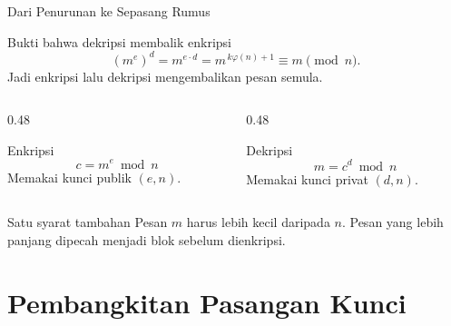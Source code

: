\documentclass[aspectratio=169,11pt]{beamer}
\begin{document}
\begin{frame}{Dari Penurunan ke Sepasang Rumus}
    \footnotesize
    \begin{block}{Bukti bahwa dekripsi membalik enkripsi}
        \[
            (m^{e})^{d} = m^{e \cdot d}
            = m^{\,k\varphi(n)+1} \equiv m \pmod{n}.
        \]
        Jadi enkripsi lalu dekripsi mengembalikan pesan semula.
    \end{block}
    \vspace{0.15cm}
    \begin{columns}[T,onlytextwidth]
        \begin{column}{0.48\textwidth}
            \begin{exampleblock}{Enkripsi}
                \[ c = m^{e} \bmod n \]
                Memakai kunci publik $(e,n)$.
            \end{exampleblock}
        \end{column}
        \begin{column}{0.48\textwidth}
            \begin{exampleblock}{Dekripsi}
                \[ m = c^{d} \bmod n \]
                Memakai kunci privat $(d,n)$.
            \end{exampleblock}
        \end{column}
    \end{columns}
    \vspace{0.1cm}
    \begin{alertblock}{Satu syarat tambahan}
        \footnotesize
        Pesan $m$ harus lebih kecil daripada $n$. Pesan yang lebih panjang
        dipecah menjadi blok sebelum dienkripsi.
    \end{alertblock}
\end{frame}

\section{Pembangkitan Pasangan Kunci}
\end{document}
